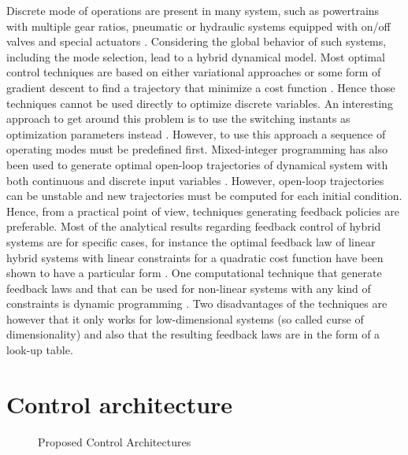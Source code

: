 Discrete mode of operations are present in many system, such as powertrains with multiple gear ratios, pneumatic or hydraulic systems equipped with on/off valves and special actuators \cite{leach_linear_2012}\cite{Wolfgang_novel_2015}\cite{lee_finger_2013}. Considering the global behavior of such systems, including the mode selection, lead to a hybrid dynamical model. Most optimal control techniques are based on either variational approaches or some form of gradient descent to find a trajectory that minimize a cost function \cite{betts_practical_2010}. Hence those techniques cannot be used directly to optimize discrete variables. An interesting approach to get around this problem is to use the switching instants as optimization parameters instead \cite{xu_optimal_2004}\cite{majdoub_hybrid_2010}. However, to use this approach a sequence of operating modes must be predefined first. Mixed-integer programming has also been used to generate optimal open-loop trajectories of dynamical system with both continuous and discrete input variables \cite{richards_spacecraft_2002} \cite{gerdts_solving_2005}. However, open-loop trajectories can be unstable and new trajectories must be computed for each initial condition. Hence, from a practical point of view, techniques generating feedback policies are preferable. Most of the analytical results regarding feedback control of hybrid systems are for specific cases, for instance the optimal feedback law of linear hybrid systems with linear constraints for a quadratic cost function have been shown to have a particular form \cite{borrelli_dynamic_2005}. One computational technique that generate feedback laws and that can be used for non-linear systems with any kind of constraints is dynamic programming \cite{donald_e._kirk_optimal_2004}. Two disadvantages of the techniques are however that it only works for low-dimensional systems (so called curse of dimensionality) and also that the resulting feedback laws are in the form of a look-up table.


\newpage

\section{Control architecture}
\label{sec:arch}

\begin{figure}[H]
        \centering
				\hspace{+10pt}
        \caption{Proposed Control Architectures}
				\label{fig:controlarchitectures}
\end{figure}

